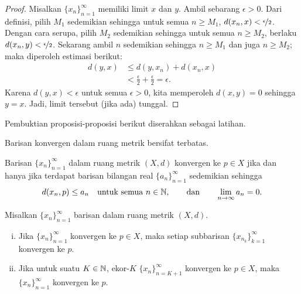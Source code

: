 \begin{proof}
Misalkan $\{ x_n \}_{n=1}^\infty$ memiliki limit $x$ dan $y$.
Ambil sebarang $\epsilon > 0$.
Dari definisi, pilih $M_1$ sedemikian sehingga untuk semua $n \geq M_1$,
$d(x_n,x) < \nicefrac{\epsilon}{2}$.  Dengan cara serupa, pilih $M_2$
sedemikian sehingga untuk semua $n \geq M_2$, berlaku
$d(x_n,y) < \nicefrac{\epsilon}{2}$.  Sekarang ambil $n$ sedemikian sehingga
$n \geq M_1$ dan juga $n \geq M_2$; maka diperoleh estimasi berikut:
\begin{equation*}
\begin{split}
d(y,x)
& \leq
d(y,x_n) + d(x_n,x) \\
& <
\frac{\epsilon}{2} + \frac{\epsilon}{2} = \epsilon .
\end{split}
\end{equation*}
Karena $d(y,x) < \epsilon$ untuk semua $\epsilon > 0$, kita memperoleh $d(x,y) = 0$
sehingga $y=x$.  Jadi, limit tersebut (jika ada) tunggal.
\end{proof}

Pembuktian proposisi-proposisi berikut diserahkan sebagai latihan.

\begin{prop} \label{prop:msconvbound}
Barisan konvergen dalam ruang metrik bersifat terbatas.
\end{prop}

\begin{prop} \label{prop:msconvifa}
Barisan $\{ x_n \}_{n=1}^\infty$ dalam ruang metrik $(X,d)$ konvergen ke $p \in X$
jika dan hanya
jika terdapat barisan bilangan real $\{ a_n \}_{n=1}^\infty$ sedemikian sehingga
\begin{equation*}
d(x_n,p) \leq a_n \quad \text{untuk semua } n \in {\mathbb{N}},
\qquad
\text{dan}
\qquad
\lim_{n\to\infty} a_n = 0.
\end{equation*}
\end{prop}

\begin{prop} \label{prop:mssubseq}
Misalkan $\{ x_n \}_{n=1}^\infty$ barisan dalam ruang metrik $(X,d)$.
\begin{enumerate}[(i)]
\item Jika $\{ x_n \}_{n=1}^\infty$ konvergen ke $p \in X$, maka setiap
subbarisan $\{ x_{n_k} \}_{k=1}^\infty$
konvergen ke $p$.
\item Jika untuk suatu $K \in {\mathbb{N}}$, ekor-$K$ $\{ x_n \}_{n=K+1}^\infty$
konvergen ke $p \in X$, maka
 $\{ x_n \}_{n=1}^\infty$ konvergen ke $p$.
\end{enumerate}
\end{prop}

